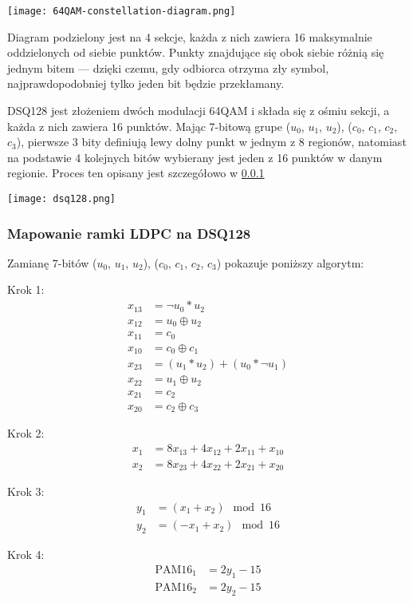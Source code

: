\texttt{[image: 64QAM-constellation-diagram.png]}

Diagram podzielony jest na 4 sekcje, każda z nich zawiera 16 maksymalnie oddzielonych od siebie punktów. Punkty znajdujące się obok siebie różnią się jednym bitem --- dzięki czemu, gdy odbiorca otrzyma zły symbol, najprawdopodobniej tylko jeden bit będzie przekłamany.

DSQ128 jest złożeniem dwóch modulacji 64QAM i składa się z ośmiu sekcji, a każda z nich zawiera 16 punktów. Mając 7-bitową grupe ($u_0$, $u_1$, $u_2$), ($c_0$, $c_1$, $c_2$, $c_3$), pierwsze 3 bity definiują lewy dolny punkt w jednym z 8 regionów, natomiast na podstawie 4 kolejnych bitów wybierany jest jeden z 16 punktów w danym regionie. Proces ten opisany jest szczegółowo w \ref{mapowanie}

\texttt{[image: dsq128.png]}

\subsubsection{Mapowanie ramki LDPC na DSQ128}\label{mapowanie}
Zamianę 7-bitów ($u_0$, $u_1$, $u_2$), ($c_0$, $c_1$, $c_2$, $c_3$) pokazuje poniższy algorytm:

Krok 1:
\begin{align*}
    x_{13} &= \neg u_0 * u_2 \\
    x_{12} &= u_0 \oplus u_2 \\
    x_{11} &= c_0 \\
    x_{10} &= c_0 \oplus c_1 \\
    x_{23} &= (u_1 * u_2) + (u_0 * \neg u_1) \\
    x_{22} &= u_1 \oplus u_2 \\
    x_{21} &= c_2 \\
    x_{20} &= c_2 \oplus c_3
\end{align*}

Krok 2:
\begin{align*}
    x_1 &= 8x_{13} + 4x_{12} + 2x_{11} + x_{10} \\
    x_2 &= 8x_{23} + 4x_{22} + 2x_{21} + x_{20}
\end{align*}

Krok 3:
\begin{align*}
    y_1 &= (x_1 + x_2) \mod 16 \\
    y_2 &= (-x_1 + x_2) \mod 16
\end{align*}

Krok 4:
\begin{align*}
    \text{PAM16}_1 &= 2y_1 - 15 \\
    \text{PAM16}_2 &= 2y_2 - 15
\end{align*}

